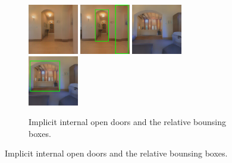 \begin{figure}[h!]
	\centering
	\begin{subfigure}[b]{\linewidth}
		\centering
		\includegraphics[width=0.24\textwidth]{images/implicitdoor1.png}
		\hfill
		\includegraphics[width=0.24\textwidth]{images/implicitdoor1boxed.png}
		\hfill
		\includegraphics[width=0.24\textwidth]{images/implicitdoor2.png}
		\hfill
		\includegraphics[width=0.24\textwidth]{images/implicitdoor2boxed.png}
		\caption{Implicit internal open doors and the relative bounsing boxes.}
	\end{subfigure}
	

\end{figure}
